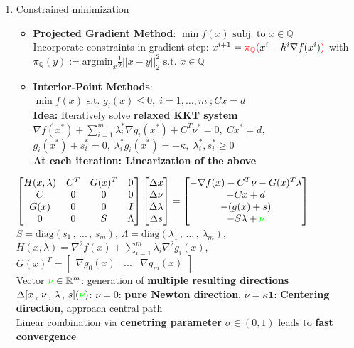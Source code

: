 \begin{enumerate}
\begin{itemize}
    \end{itemize}
    \item Constrained minimization
    \begin{itemize}
        \item \textbf{Projected Gradient Method}: $\min f(x) \text{ subj. to }x\in\mathbb{Q}$\\
        \Rightarrow Incorporate constraints in gradient step: $x^{i+1}=\textcolor{red}{\pi_\mathbb{Q}(\textcolor{black}{x^i-h^i\nabla f(x^i)})}$ with $\pi_\mathbb{Q}(y):=\text{argmin}_x\frac{1}{2}||x-y||_2^2\text{ s.t. }x\in \mathbb{Q}$
        \item \textbf{Interior-Point Methods}: $\min f(x)\text{ s.t. }g_i(x)\leq0,\;i=1, \ldots ,m\;;Cx=d$\\
        \textbf{Idea:} Iteratively solve \textbf{relaxed KKT system}\\
        $\nabla f(x^*)+\sum_{i=1}^m\lambda_i^*\nabla g_i(x^*)+C^T\nu^*=0,\;Cx^*=d,$\;\\$g_i(x^*)+s_i^*=0,\;\lambda_i^*g_i(x^*)=-\kappa,\;\lambda_i^*,s_i^*\geq0$\\
        \textbf{At each iteration: Linearization of the above}\\
    \end{itemize}
    $\begin{bmatrix}
            H(x,\lambda)&C^T&G(x)^T&0\\C&0&0&0\\
            G(x)&0&0&I\\0&0&S&\Lambda
        \end{bmatrix}\begin{bmatrix}
            \Delta x\\\Delta \nu\\\Delta\lambda\\\Delta s
        \end{bmatrix}=\begin{bmatrix}
            -\nabla f(x)-C^T\nu-G(x)^T\lambda\\-Cx+d\\-(g(x)+s)\\-S\lambda+\textcolor{green}{\nu}
        \end{bmatrix}$\\
        $S=\text{diag}(s_1\,,\,...\,,\,s_m)$, $\Lambda=\text{diag}(\lambda_1\,,\,...\,,\,\lambda_m)$, $H(x,\lambda)=\nabla^2f(x)+\sum_{i=1}^m\lambda_i\nabla^2g_i(x)$, $G(x)^T=\begin{bmatrix}
            \nabla g_0(x)&...&\nabla g_m(x)
        \end{bmatrix}$\\
        Vector $\textcolor{green}{\nu}\in\mathbb{R}^m$: generation of \textbf{multiple resulting directions} $\Delta[x\,,\,\nu\,,\,\lambda\,,\,s](\textcolor{green}{\nu})$:
        $\nu=0$:\textbf{ pure Newton direction}, $\nu=\kappa\textbf{1}$: \textbf{Centering direction}, approach central path\\
        \Rightarrow Linear combination via \textbf{cenetring parameter} $\sigma\in(0,1)$ leads to \textbf{fast convergence}
    
\end{enumerate}